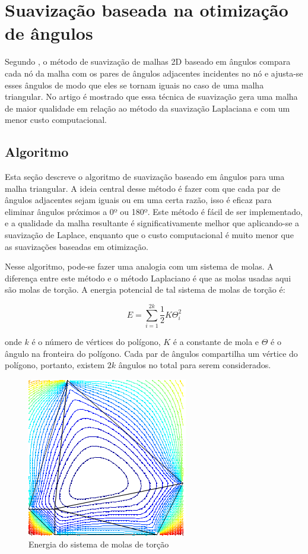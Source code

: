 \section{Suavização baseada na otimização de ângulos}

Segundo \cite{Zhou}, o método de suavização de malhas 2D baseado em ângulos compara cada nó da malha com os pares de ângulos adjacentes incidentes no nó e ajusta-se esses ângulos de modo que eles se tornam iguais no caso de uma malha triangular. No artigo é mostrado que essa técnica de suavização gera uma malha de maior qualidade em relação ao método da suavização Laplaciana e com um menor custo computacional.

\subsection{Algoritmo}
Esta seção descreve o algoritmo de suavização baseado em ângulos para uma malha triangular. A ideia central desse método é fazer com que cada par de ângulos adjacentes sejam iguais ou em uma certa razão, isso é eficaz para eliminar ângulos próximos a 0º ou 180º. Este método é fácil de ser implementado, e a qualidade da malha resultante é significativamente melhor que aplicando-se a suavização de Laplace, enquanto que o custo computacional é muito menor que as suavizações baseadas em otimização.

Nesse algoritmo, pode-se fazer uma analogia com um sistema de molas. A diferença entre este método e o método Laplaciano é que as molas usadas aqui são molas de torção. A energia potencial de tal sistema de molas de torção é:

\begin{equation*}
    E = \sum_{i=1}^{2k} \frac{1}{2} K \Theta_i^2
\end{equation*}

onde $k$ é o número de vértices do polígono, $K$ é a constante de mola e $\Theta$ é o ângulo na fronteira do polígono. Cada par de ângulos compartilha um vértice do polígono, portanto, existem $2k$ ângulos no total para serem considerados.

\begin{figure}[h]
    \centering
    \includegraphics{fig/contorno-mola-torcao.png}
    \caption{Energia do sistema de molas de torção}
    \label{fig:contorno-mola-torcao}
\end{figure}

